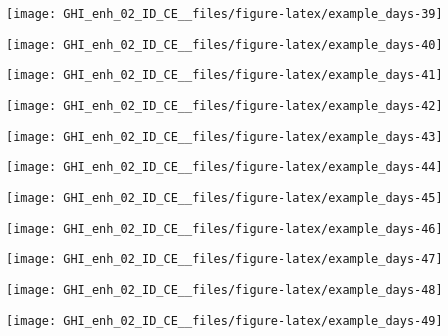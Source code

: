 \documentclass[
  10pt,
  a4paper,oneside]{article}
\begin{document}
\begin{center}\texttt{[image: GHI\_enh\_02\_ID\_CE\_\_files/figure-latex/example\_days-39]} \end{center}

\begin{center}\texttt{[image: GHI\_enh\_02\_ID\_CE\_\_files/figure-latex/example\_days-40]} \end{center}

\begin{center}\texttt{[image: GHI\_enh\_02\_ID\_CE\_\_files/figure-latex/example\_days-41]} \end{center}

\begin{center}\texttt{[image: GHI\_enh\_02\_ID\_CE\_\_files/figure-latex/example\_days-42]} \end{center}

\begin{center}\texttt{[image: GHI\_enh\_02\_ID\_CE\_\_files/figure-latex/example\_days-43]} \end{center}

\begin{center}\texttt{[image: GHI\_enh\_02\_ID\_CE\_\_files/figure-latex/example\_days-44]} \end{center}

\begin{center}\texttt{[image: GHI\_enh\_02\_ID\_CE\_\_files/figure-latex/example\_days-45]} \end{center}

\begin{center}\texttt{[image: GHI\_enh\_02\_ID\_CE\_\_files/figure-latex/example\_days-46]} \end{center}

\begin{center}\texttt{[image: GHI\_enh\_02\_ID\_CE\_\_files/figure-latex/example\_days-47]} \end{center}

\begin{center}\texttt{[image: GHI\_enh\_02\_ID\_CE\_\_files/figure-latex/example\_days-48]} \end{center}

\begin{center}\texttt{[image: GHI\_enh\_02\_ID\_CE\_\_files/figure-latex/example\_days-49]} \end{center}
\end{document}
